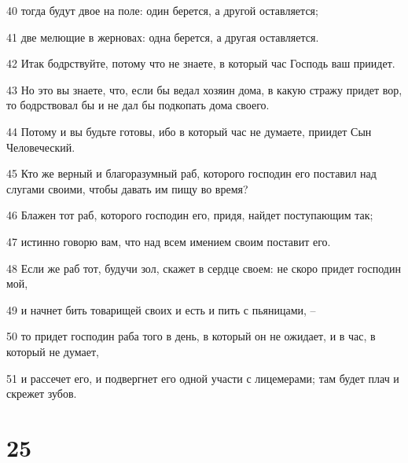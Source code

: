 \par 40 тогда будут двое на поле: один берется, а другой оставляется;
\par 41 две мелющие в жерновах: одна берется, а другая оставляется.
\par 42 Итак бодрствуйте, потому что не знаете, в который час Господь ваш приидет.
\par 43 Но это вы знаете, что, если бы ведал хозяин дома, в какую стражу придет вор, то бодрствовал бы и не дал бы подкопать дома своего.
\par 44 Потому и вы будьте готовы, ибо в который час не думаете, приидет Сын Человеческий.
\par 45 Кто же верный и благоразумный раб, которого господин его поставил над слугами своими, чтобы давать им пищу во время?
\par 46 Блажен тот раб, которого господин его, придя, найдет поступающим так;
\par 47 истинно говорю вам, что над всем имением своим поставит его.
\par 48 Если же раб тот, будучи зол, скажет в сердце своем: не скоро придет господин мой,
\par 49 и начнет бить товарищей своих и есть и пить с пьяницами, --
\par 50 то придет господин раба того в день, в который он не ожидает, и в час, в который не думает,
\par 51 и рассечет его, и подвергнет его одной участи с лицемерами; там будет плач и скрежет зубов.

\chapter{25}

